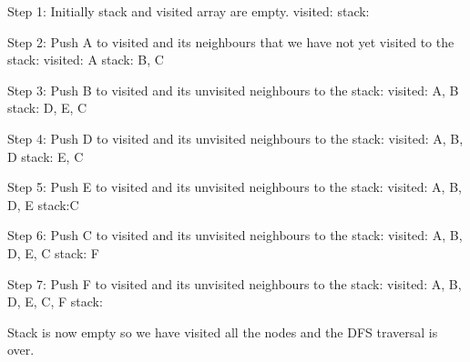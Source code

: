 \documentclass{article}
\begin{document}
Step 1: Initially stack and visited array are empty.
visited: \newline
stack: \newline

Step 2: Push A to visited and its neighbours that we have not yet visited to the stack:
visited: A \newline
stack: B, C \newline

Step 3: Push B to visited and its unvisited neighbours to the stack:
visited: A, B \newline
stack: D, E, C \newline

Step 4: Push D to visited and its unvisited neighbours to the stack:
visited: A, B, D \newline
stack: E, C \newline

Step 5: Push E to visited and its unvisited neighbours to the stack:
visited: A, B, D, E \newline
stack:C \newline

Step 6: Push C to visited and its unvisited neighbours to the stack:
visited: A, B, D, E, C \newline
stack: F \newline

Step 7: Push F to visited and its unvisited neighbours to the stack:
visited: A, B, D, E, C, F \newline
stack: \newline

Stack is now empty so we have visited all the nodes and the DFS traversal is over.
\end{document}

